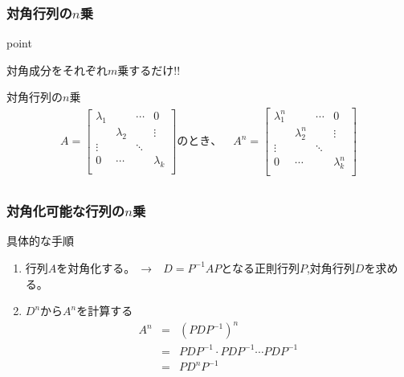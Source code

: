 \documentclass[a4paper]{jsarticle}
\begin{document}
\subsubsection{対角行列の$n$乗}
\begin{itembox}[l]{point}
    \begin{center}
        対角成分をそれぞれ$m$乗するだけ!!
    \end{center}
\end{itembox}
\begin{itembox}[l]{対角行列の$n$乗}
    \begin{eqnarray*}
        A=
        \begin{bmatrix}
            \lambda_1 &           & \cdots & 0         \\
                      & \lambda_2 &        & \vdots    \\
            \vdots    &           & \ddots &           \\
            0         & \cdots    &        & \lambda_k \\
        \end{bmatrix}
        のとき、\quad A^n=
        \begin{bmatrix}
            \lambda_1^n &             & \cdots & 0           \\
                        & \lambda_2^n &        & \vdots      \\
            \vdots      &             & \ddots &             \\
            0           & \cdots      &        & \lambda_k^n \\
        \end{bmatrix}\\
    \end{eqnarray*}
\end{itembox}
\subsubsection{対角化可能な行列の$n$乗}
\begin{itembox}[l]{具体的な手順}
    \begin{enumerate}
        \item 行列$A$を対角化する。　→　$D=P^{-1}AP$となる正則行列$P$,対角行列$D$を求める。
        \item $D^n$から$A^n$を計算する
              \begin{eqnarray*}
                  A^n
                  &=&\left(PDP^{-1}\right)^n\\
                  &=&PDP^{-1}\cdot PDP^{-1}\cdots PDP^{-1}\\
                  &=&PD^nP^{-1}
              \end{eqnarray*}
    \end{enumerate}
\end{itembox}
\newpage
\end{document}
